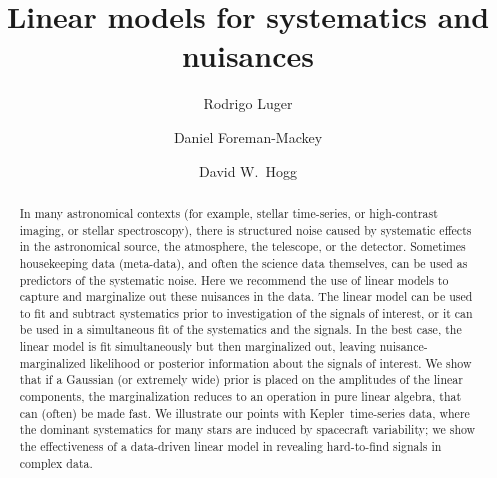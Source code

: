 \documentclass[modern]{rnaastex}
\newcommand{\project}[1]{\textsf{#1}}
\newcommand{\kepler}{\project{Kepler}}
\begin{document}
\raggedbottom\sloppy\sloppypar\frenchspacing

\title{%
    Linear models for systematics and nuisances
}

\author[0000-0002-0296-3826]{Rodrigo Luger}

\author[0000-0002-9328-5652]{Daniel Foreman-Mackey}

\author[0000-0003-2866-9403]{David W.\ Hogg}

\begin{abstract}\noindent
In many astronomical contexts (for example, stellar time-series, or
high-contrast imaging, or stellar spectroscopy), there is structured
noise caused by systematic
effects in the astronomical source, the atmosphere, the telescope, or
the detector.
Sometimes housekeeping data (meta-data), and often the science data themselves,
can be used as predictors of the systematic noise.
Here we recommend the use of linear models to capture and marginalize
out these nuisances in the data.
The linear model can be used to fit and subtract systematics prior to
investigation of the signals of interest, or it
can be used in a simultaneous fit of the systematics and the signals.
In the best case, the linear model is fit simultaneously but then marginalized
out, leaving nuisance-marginalized likelihood or posterior information
about the signals of interest.
We show that if a Gaussian (or extremely wide) prior is placed on the
amplitudes of the linear components, the marginalization reduces to an
operation in pure linear algebra, that can (often) be made fast.
We illustrate our points with \kepler\ time-series data, where the dominant
systematics for many stars are induced by spacecraft variability;
we show the effectiveness of a data-driven linear model in revealing
hard-to-find signals in complex data.
\end{abstract}

\end{document}
